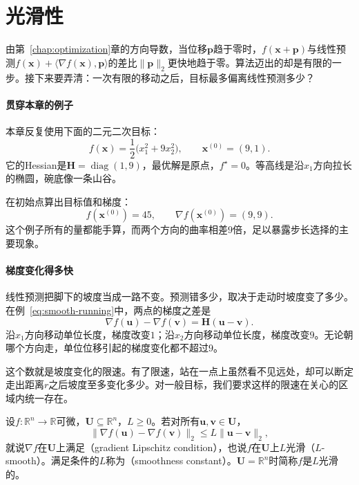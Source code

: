 \section{光滑性}
\label{sec:smooth-lipschitz}

由第~\ref{chap:optimization}章的方向导数，当位移$\bm{p}$趋于零时，$f(\bm{x}+\bm{p})$与线性预测$f(\bm{x})+\langle\nabla f(\bm{x}),\bm{p}\rangle$的差比$\lVert\bm{p}\rVert_2$更快地趋于零。算法迈出的却是有限的一步。接下来要弄清：一次有限的移动之后，目标最多偏离线性预测多少？

\paragraph{贯穿本章的例子}
本章反复使用下面的二元二次目标：
\begin{equation}
 f(\bm{x})=\frac12\bigl(x_1^2+9x_2^2\bigr),\qquad \bm{x}^{(0)}=(9,1).
 \label{eq:smooth-running}
\end{equation}
它的Hessian是$\bm{H}=\operatorname{diag}(1,9)$，最优解是原点，$f^\star=0$。等高线是沿$x_1$方向拉长的椭圆，碗底像一条山谷。

在初始点算出目标值和梯度：
\[
 f(\bm{x}^{(0)})=45,\qquad \nabla f(\bm{x}^{(0)})=(9,9).
\]
这个例子所有的量都能手算，而两个方向的曲率相差$9$倍，足以暴露步长选择的主要现象。

\paragraph{梯度变化得多快}
线性预测把脚下的坡度当成一路不变。预测错多少，取决于走动时坡度变了多少。在例~\eqref{eq:smooth-running}中，两点的梯度之差是
\[
 \nabla f(\bm{u})-\nabla f(\bm{v})=\bm{H}(\bm{u}-\bm{v}).
\]
沿$x_1$方向移动单位长度，梯度改变$1$；沿$x_2$方向移动单位长度，梯度改变$9$。无论朝哪个方向走，单位位移引起的梯度变化都不超过$9$。

这个数就是坡度变化的限速。有了限速，站在一点上虽然看不见远处，却可以断定走出距离$r$之后坡度至多变化多少。对一般目标，我们要求这样的限速在关心的区域内统一存在。

\begin{definition}[梯度Lipschitz条件]
\label{def:smooth-lipschitz}
设$f:\mathbb{R}^n\to\mathbb{R}$可微，$\bm{U}\subseteq\mathbb{R}^n$，$L\geq0$。若对所有$\bm{u},\bm{v}\in\bm{U}$，
\begin{equation}
 \lVert\nabla f(\bm{u})-\nabla f(\bm{v})\rVert_2\leq L\lVert\bm{u}-\bm{v}\rVert_2,
 \label{eq:smooth-lipschitz}
\end{equation}
就说$\nabla f$在$\bm{U}$上满足（gradient Lipschitz condition），也说$f$在$\bm{U}$上$L$光滑（$L$-smooth）。满足条件的$L$称为（smoothness constant）。$\bm{U}=\mathbb{R}^n$时简称$f$是$L$光滑的。
\end{definition}

